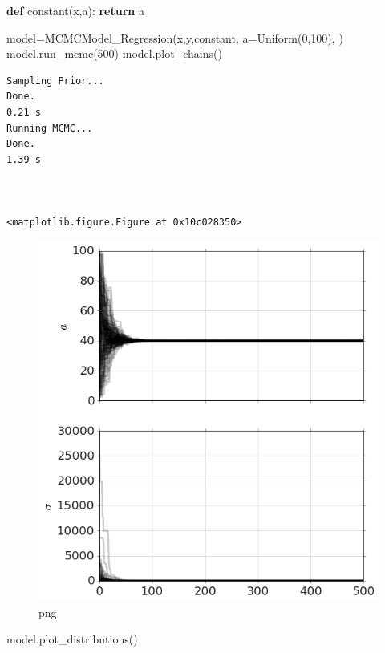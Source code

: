 \documentclass[]{article}
\newenvironment{Shaded}{}{}
\newcommand{\KeywordTok}[1]{\textcolor[rgb]{0.00,0.44,0.13}{\textbf{{#1}}}}
\newcommand{\DecValTok}[1]{\textcolor[rgb]{0.25,0.63,0.44}{{#1}}}
\newcommand{\NormalTok}[1]{{#1}}
\begin{document}
\begin{Shaded}
\begin{Highlighting}[]
\KeywordTok{def} \NormalTok{constant(x,a):}
    \KeywordTok{return} \NormalTok{a}

\NormalTok{model=MCMCModel_Regression(x,y,constant,}
            \NormalTok{a=Uniform(}\DecValTok{0}\NormalTok{,}\DecValTok{100}\NormalTok{),}
            \NormalTok{)}
\NormalTok{model.run_mcmc(}\DecValTok{500}\NormalTok{)}
\NormalTok{model.plot_chains()}
\end{Highlighting}
\end{Shaded}

\begin{verbatim}
Sampling Prior...
Done.
0.21 s
Running MCMC...
Done.
1.39 s



<matplotlib.figure.Figure at 0x10c028350>
\end{verbatim}

\begin{figure}[htbp]
\centering
\includegraphics{output_16_2.png}
\caption{png}
\end{figure}

\begin{Shaded}
\begin{Highlighting}[]
\NormalTok{model.plot_distributions()}
\end{Highlighting}
\end{Shaded}
\end{document}
